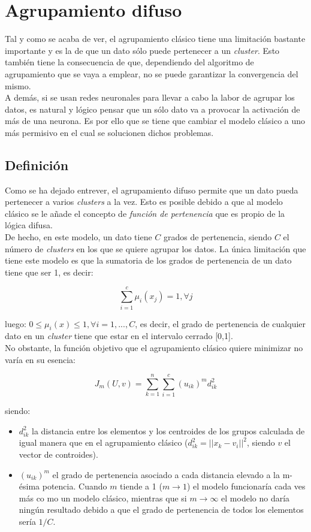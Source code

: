 \documentclass[]{report}
\begin{document}
	\chapter{Agrupamiento difuso}
		Tal y como se acaba de ver, el agrupamiento clásico tiene una limitación bastante importante y es la de que un dato sólo puede pertenecer a un \textit{cluster}. Esto también tiene la consecuencia de que, dependiendo del algoritmo de agrupamiento que se vaya a emplear, no se puede garantizar la convergencia del mismo.\\
		
		A demás, si se usan redes neuronales para llevar a cabo la labor de agrupar los datos, es natural y lógico pensar que un sólo dato va a provocar la activación de más de una neurona. Es por ello que se tiene que cambiar el modelo clásico a uno más permisivo en el cual se solucionen dichos problemas.
			
		\section{Definición}
			Como se ha dejado entrever, el agrupamiento difuso permite que un dato pueda pertenecer a varios \textit{clusters} a la vez. Esto es posible debido a que al modelo clásico se le añade el concepto de \textit{función de pertenencia} que es propio de la lógica difusa.\\
			
			De hecho, en este modelo, un dato tiene $C$ grados de pertenencia, siendo $C$ el número de \textit{clusters} en los que se quiere agrupar los datos. La única limitación que tiene este modelo es que la sumatoria de los grados de pertenencia de un dato tiene que ser 1, es decir:
			
			$$\sum_{i=1}^c\mu_i(x_j) = 1, \forall j$$
			
			luego: $0 \leq \mu_i(x) \leq 1, \forall i=1,...,C$, es decir, el grado de pertenencia de cualquier dato en un \textit{cluster} tiene que estar en el intervalo cerrado [0,1].\\
			
			No obstante, la función objetivo que el agrupamiento clásico quiere minimizar no varía en su esencia:
			
			$$J_m(U,v) = \sum_{k=1}^n \sum_{i=1}^c (u_{ik})^m d^2_{ik}$$

			siendo:
			\begin{itemize}
				\item $d^2_{ik}$ la distancia entre los elementos y los centroides de los grupos calculada de igual manera que en el agrupamiento clásico ($d^2_{ik} = ||x_k-v_i||^2$, siendo $v$ el vector de controides).
				\item $(u_{ik})^m$ el grado de pertenencia asociado a cada distancia elevado a la m-ésima potencia. Cuando $m$ tiende a 1 ($m \rightarrow 1$) el modelo funcionaría cada ves más co mo un modelo clásico, mientras que si $m \rightarrow \infty$ el modelo no daría ningún resultado debido a que el grado de pertenencia de todos los elementos sería $1/C$.
			\end{itemize}
		
\end{document}
